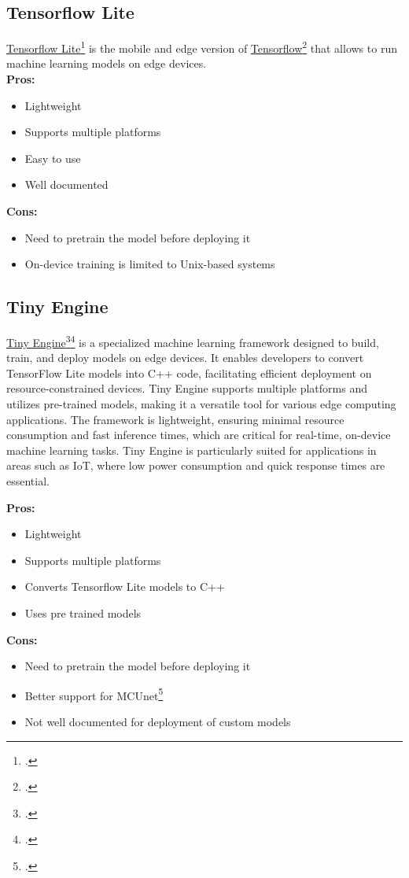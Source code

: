 \subsection{Tensorflow Lite}
\label{tensorflow-lite}
\href{https://www.tensorflow.org/lite}{Tensorflow Lite}\footcite{site:tflite} is the mobile and edge version of \href{https://www.tensorflow.org/}{Tensorflow}\footcite{site:tensorflow} that allows to run machine learning models on edge devices.\\
\textbf{Pros:}
\begin{itemize}
    \item Lightweight
    \item Supports multiple platforms
    \item Easy to use
    \item Well documented
\end{itemize}
\textbf{Cons:}
\begin{itemize}
    \item Need to pretrain the model before deploying it
    \item On-device training is limited to Unix-based systems
\end{itemize}

\subsection{Tiny Engine}
\label{tiny-engine}
\href{https://github.com/mit-han-lab/tinyengine}{Tiny Engine}\footcite{site:tinyengine}\footcite{lin2022ondevice} is a specialized machine learning framework designed to build, train, and deploy models on edge devices. It enables developers to convert TensorFlow Lite models into C++ code, facilitating efficient deployment on resource-constrained devices. Tiny Engine supports multiple platforms and utilizes pre-trained models, making it a versatile tool for various edge computing applications. The framework is lightweight, ensuring minimal resource consumption and fast inference times, which are critical for real-time, on-device machine learning tasks. Tiny Engine is particularly suited for applications in areas such as IoT, where low power consumption and quick response times are essential.

\textbf{Pros:}
\begin{itemize}
    \item Lightweight
    \item Supports multiple platforms
    \item Converts Tensorflow Lite models to C++
    \item Uses pre trained models
\end{itemize}
\textbf{Cons:}
\begin{itemize}
    \item Need to pretrain the model before deploying it
    \item Better support for MCUnet\footcite{lin2020mcunet}
    \item Not well documented for deployment of custom models
\end{itemize}



